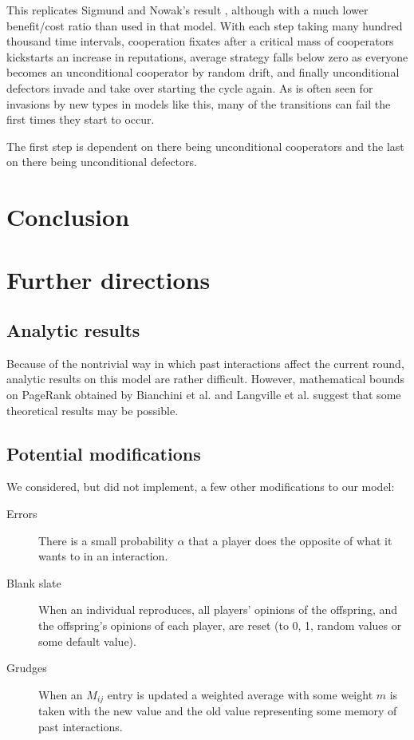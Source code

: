 \documentclass{amsart}
\begin{document}
This replicates Sigmund and Nowak's result
\cite{nowak_evolution_1998}, although with a much lower benefit/cost
ratio than used in that model. With each step taking many hundred
thousand time intervals, cooperation fixates after a critical mass of
cooperators kickstarts an increase in reputations, average strategy
falls below zero as everyone becomes an unconditional cooperator by
random drift, and finally unconditional defectors invade and take over
starting the cycle again. As is often seen for invasions by new types
in models like this, many of the transitions can fail the first times
they start to occur.

The first step is dependent on there being unconditional cooperators
and the last on there being unconditional defectors.


\section{Conclusion}
\label{sec:conclusion}

\section{Further directions}

\subsection{Analytic results}

Because of the nontrivial way in which past interactions affect the
current round, analytic results on this model are rather
difficult. However, mathematical bounds on PageRank obtained by
Bianchini et al. \cite{bianchini_Inside_2005} and Langville et
al. \cite{langville_deeper_2004} suggest that some theoretical results
may be possible.

\subsection{Potential modifications}

We considered, but did not implement, a few other modifications to our
model:
\begin{description}
\item[Errors] There is a small probability $\alpha$ that a player does
  the opposite of what it wants to in an interaction.
\item[Blank slate] When an individual reproduces, all players'
  opinions of the offspring, and the offspring's opinions of each
  player, are reset (to 0, 1, random values or some default value).
\item[Grudges] When an $M_{ij}$ entry is updated a weighted average
  with some weight $m$ is taken with the new value and the old value
  representing some memory of past interactions.
\end{description}
\end{document}
